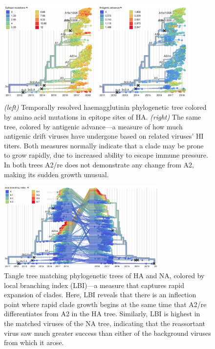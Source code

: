 \begin{figure}[h]
    \begin{center}
    \includegraphics[width=0.9\textwidth]{figures/epitope_aa.png}
    \end{center}
    \caption{\textit{(left)} Temporally resolved haemagglutinin phylogenetic tree colored by amino acid mutations in epitope sites \cite{Wolf2006} of HA. \textit{(right)} The same tree, colored by antigenic advance---a measure of how much antigenic drift viruses have undergone based on related viruses' HI titers. Both measures normally indicate that a clade may be prone to grow rapidly, due to increased ability to escape immune pressure. In both trees A2/re does not demonstrate any change from A2, making its sudden growth unusual.}
    \label{sup_fig:epitope_aa}
\end{figure}

\begin{figure}[b]
    \begin{center}
    \includegraphics[width=0.75\textwidth]{figures/LBI_tangletree.png}
    \end{center}
    \caption{Tangle tree matching phylogenetic trees of HA and NA, colored by local branching index (LBI)---a measure that captures rapid expansion of clades. Here, LBI reveals that there is an inflection point where rapid clade growth begins at the same time that A2/re differentiates from A2 in the HA tree. Similarly, LBI is highest in the matched viruses of the NA tree, indicating that the reassortant virus saw much greater success than either of the background viruses from which it arose.}
    \label{sup_fig:lbi}
\end{figure}

